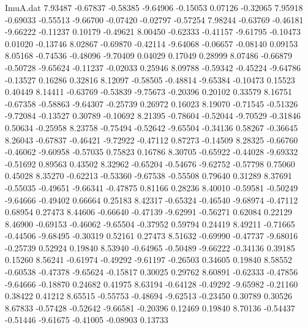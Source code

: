 \begin{filecontents}{ImuA.dat}
   7.93487   -0.67837   -0.58385   -9.64906   -0.15053    0.07126   -0.32065
   7.95918   -0.69033   -0.55513   -9.66700   -0.07420   -0.02797   -0.57254
   7.98244   -0.63769   -0.46181   -9.66222   -0.11237    0.10179   -0.49621
   8.00450   -0.62333   -0.41157   -9.61795   -0.10473    0.01020   -0.13746
   8.02867   -0.69870   -0.42114   -9.64068   -0.06657   -0.08140    0.09153
   8.05168   -0.74536   -0.48096   -9.70409    0.04029    0.17049    0.28999
   8.07486   -0.66879   -0.50728   -9.65624   -0.11237   -0.02033    0.25946
   8.09788   -0.59342   -0.45224   -9.64786   -0.13527    0.16286    0.32816
   8.12097   -0.58505   -0.48814   -9.65384   -0.10473    0.15523    0.40449
   8.14411   -0.63769   -0.53839   -9.75673   -0.20396    0.20102    0.33579
   8.16751   -0.67358   -0.58863   -9.64307   -0.25739    0.26972    0.16023
   8.19070   -0.71545   -0.51326   -9.72084   -0.13527    0.30789   -0.10692
   8.21395   -0.78604   -0.52044   -9.70529   -0.31846    0.50634   -0.25958
   8.23758   -0.75494   -0.52642   -9.65504   -0.34136    0.58267   -0.36645
   8.26043   -0.67837   -0.46421   -9.72922   -0.47112    0.87273   -0.14509
   8.28325   -0.66760   -0.46062   -9.60958   -0.57035    0.75823    0.16786
   8.30705   -0.65922   -0.44028   -9.69332   -0.51692    0.89563    0.43502
   8.32962   -0.65204   -0.54676   -9.62752   -0.57798    0.75060    0.45028
   8.35270   -0.62213   -0.53360   -9.67538   -0.55508    0.79640    0.31289
   8.37691   -0.55035   -0.49651   -9.66341   -0.47875    0.81166    0.28236
   8.40010   -0.59581   -0.50249   -9.64666   -0.49402    0.66664    0.25183
   8.42317   -0.65324   -0.46540   -9.68974   -0.47112    0.68954    0.27473
   8.44606   -0.66640   -0.47139   -9.62991   -0.56271    0.62084    0.22129
   8.46900   -0.69153   -0.46062   -9.65504   -0.37952    0.59794    0.24419
   8.49211   -0.71665   -0.44506   -9.68495   -0.30319    0.52161    0.27473
   8.51632   -0.69990   -0.47737   -9.68016   -0.25739    0.52924    0.19840
   8.53940   -0.64965   -0.50489   -9.66222   -0.34136    0.39185    0.15260
   8.56241   -0.61974   -0.49292   -9.61197   -0.26503    0.34605    0.19840
   8.58552   -0.60538   -0.47378   -9.65624   -0.15817    0.30025    0.29762
   8.60891   -0.62333   -0.47856   -9.64666   -0.18870    0.24682    0.41975
   8.63194   -0.64128   -0.49292   -9.65982   -0.21160    0.38422    0.41212
   8.65515   -0.55753   -0.48694   -9.62513   -0.23450    0.30789    0.30526
   8.67833   -0.57428   -0.52642   -9.66581   -0.20396    0.12469    0.19840
   8.70136   -0.54437   -0.51446   -9.61675   -0.41005   -0.08903    0.13733

\end{filecontents}
